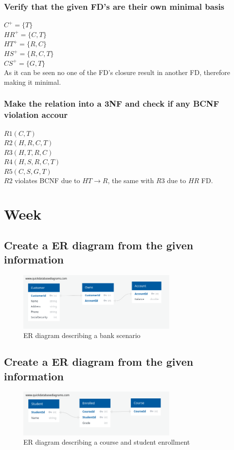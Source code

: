 \documentclass[12pt, a4paper]{article}
\begin{document}
					\subsubsection{Verify that the given FD's are their own minimal basis}
						$C^+=\{T\}$\\
						$HR^+=\{C,T\}$\\
						$HT^+=\{R,C\}$\\
						$HS^+=\{R,C,T\}$\\
						$CS^+=\{G,T\}$\\
						As it can be seen no one of the FD's closure result in another FD, therefore making it minimal.
					\subsubsection{Make the relation into a 3NF and check if any BCNF violation accour}
						$R1(C,T)$\\
						$R2(H,R,C,T)$\\
						$R3(H,T,R,C)$\\
						$R4(H,S,R,C,T)$\\
						$R5(C,S,G,T)$\\
						$R2$ violates BCNF due to $HT\rightarrow R$, the same with $R3$ due to $HR$ FD.
		\section{Week}
			\subsection{Create a ER diagram from the given information}
				\begin{figure}[h!]
						  \centering
						  \includegraphics[width=300px]{assets/W12E1.png}
						  \caption{ER diagram describing a bank scenario}
				\end{figure}
			\subsection{Create a ER diagram from the given information}
				\begin{figure}[h!]
						  \centering
						  \includegraphics[width=300px]{assets/W12E2.png}
						  \caption{ER diagram describing a course and student enrollment}
				\end{figure}
\end{document}
